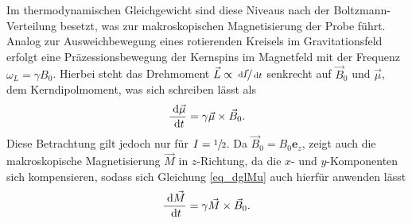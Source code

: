 \noindent 
Im thermodynamischen Gleichgewicht sind diese Niveaus nach der Boltzmann-Verteilung besetzt, was zur makroskopischen Magnetisierung der Probe führt. Analog
zur Ausweichbewegung eines rotierenden Kreisels im Gravitationsfeld erfolgt eine Präzessionsbewegung der Kernspins im Magnetfeld mit der Frequenz 
$\omega_L =\gamma B_0$. Hierbei steht das Drehmoment $\vec L \propto \sfrac{\; \mathrm{d} \vec I}{\; \mathrm{d} t}$ senkrecht auf $\vec B_0$ und $\vec \mu$, dem Kerndipolmoment,
was sich schreiben lässt als 
\begin{align}
 \frac{\; \mathrm{d} \vec \mu}{\; \mathrm{d} t} = \gamma \vec \mu \times \vec B_0.
 \label{eq_dglMu}
\end{align}
Diese Betrachtung gilt jedoch nur für $I = \sfrac12$. 
Da $\vec B_0 = B_0 \textbf{e}_z$, zeigt auch die makroskopische Magnetisierung $\vec M$ in $z$-Richtung, da die $x$- und $y$-Komponenten sich kompensieren, sodass
sich Gleichung \eqref{eq_dglMu} auch hierfür anwenden lässt
\begin{align}
 \frac{\; \mathrm{d} \vec M}{\; \mathrm{d} t} = \gamma \vec M \times \vec B_0.
 \label{eq_dglMagnetisierung}
\end{align}

